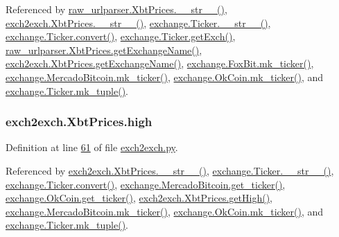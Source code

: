 Referenced by \hyperlink{raw__urlparser_8py_source_l00074}{raw\+\_\+urlparser.\+Xbt\+Prices.\+\_\+\+\_\+str\+\_\+\+\_\+()}, \hyperlink{exch2exch_8py_source_l00091}{exch2exch.\+Xbt\+Prices.\+\_\+\+\_\+str\+\_\+\+\_\+()}, \hyperlink{exchange_8py_source_l00099}{exchange.\+Ticker.\+\_\+\+\_\+str\+\_\+\+\_\+()}, \hyperlink{exchange_8py_source_l00055}{exchange.\+Ticker.\+convert()}, \hyperlink{exchange_8py_source_l00075}{exchange.\+Ticker.\+get\+Exch()}, \hyperlink{raw__urlparser_8py_source_l00068}{raw\+\_\+urlparser.\+Xbt\+Prices.\+get\+Exchange\+Name()}, \hyperlink{exch2exch_8py_source_l00085}{exch2exch.\+Xbt\+Prices.\+get\+Exchange\+Name()}, \hyperlink{exchange_8py_source_l00245}{exchange.\+Fox\+Bit.\+mk\+\_\+ticker()}, \hyperlink{exchange_8py_source_l00320}{exchange.\+Mercado\+Bitcoin.\+mk\+\_\+ticker()}, \hyperlink{exchange_8py_source_l00385}{exchange.\+Ok\+Coin.\+mk\+\_\+ticker()}, and \hyperlink{exchange_8py_source_l00084}{exchange.\+Ticker.\+mk\+\_\+tuple()}.

\subsubsection[{\texorpdfstring{high}{high}}]{\setlength{\rightskip}{0pt plus 5cm}exch2exch.\+Xbt\+Prices.\+high}\hypertarget{classexch2exch_1_1_xbt_prices_aeae6235417d65d9e9c768a51c38d5388}{}\label{classexch2exch_1_1_xbt_prices_aeae6235417d65d9e9c768a51c38d5388}


Definition at line \hyperlink{exch2exch_8py_source_l00061}{61} of file \hyperlink{exch2exch_8py_source}{exch2exch.\+py}.



Referenced by \hyperlink{exch2exch_8py_source_l00091}{exch2exch.\+Xbt\+Prices.\+\_\+\+\_\+str\+\_\+\+\_\+()}, \hyperlink{exchange_8py_source_l00099}{exchange.\+Ticker.\+\_\+\+\_\+str\+\_\+\+\_\+()}, \hyperlink{exchange_8py_source_l00055}{exchange.\+Ticker.\+convert()}, \hyperlink{exchange_8py_source_l00306}{exchange.\+Mercado\+Bitcoin.\+get\+\_\+ticker()}, \hyperlink{exchange_8py_source_l00371}{exchange.\+Ok\+Coin.\+get\+\_\+ticker()}, \hyperlink{exch2exch_8py_source_l00076}{exch2exch.\+Xbt\+Prices.\+get\+High()}, \hyperlink{exchange_8py_source_l00320}{exchange.\+Mercado\+Bitcoin.\+mk\+\_\+ticker()}, \hyperlink{exchange_8py_source_l00385}{exchange.\+Ok\+Coin.\+mk\+\_\+ticker()}, and \hyperlink{exchange_8py_source_l00084}{exchange.\+Ticker.\+mk\+\_\+tuple()}.

